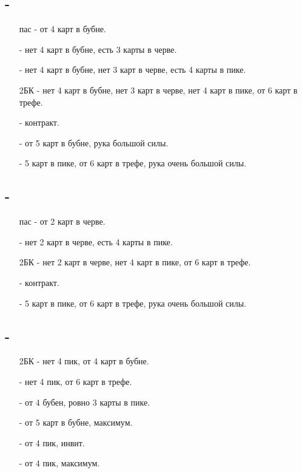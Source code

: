 \documentclass{article}
\begin{document}
\subsection{ - }
\begin{enumerate}
    \item[пас] - от 4 карт в бубне.
    \item[\he{2}] - нет 4 карт в бубне, есть 3 карты в черве.
    \item[\sp{2}] - нет 4 карт в бубне, нет 3 карт в черве, есть 4 карты в пике.
    \item[2БК] - нет 4 карт в бубне, нет 3 карт в черве, нет 4 карт в пике, от 6 карт в трефе.
    \item[\cl{3}] - контракт.
    \item[\di{3}] - от 5 карт в бубне, рука большой силы.
    \item[\sp{3}] - 5 карт в пике, от 6 карт в трефе, рука очень большой силы.
\end{enumerate}
\subsection{ - }
\begin{enumerate}
    \item[пас] - от 2 карт в черве.
    \item[\sp{2}] - нет 2 карт в черве, есть 4 карты в пике.
    \item[2БК] - нет 2 карт в черве, нет 4 карт в пике, от 6 карт в трефе.
    \item[\cl{3}] - контракт.
    \item[\sp{3}] - 5 карт в пике, от 6 карт в трефе, рука очень большой силы.
\end{enumerate}
\subsection{ - }
\begin{enumerate}
    \item[2БК] - нет 4 пик, от 4 карт в бубне.
    \item[\cl{3}] - нет 4 пик, от 6 карт в трефе.
    \item[\di{3}] - от 4 бубен, ровно 3 карты в пике.
    \item[\he{3}] - от 5 карт в бубне, максимум.
    \item[\sp{3}] - от 4 пик, инвит.
    \item[\cl{4}] - от 4 пик, максимум.
\end{enumerate}
\end{document}
